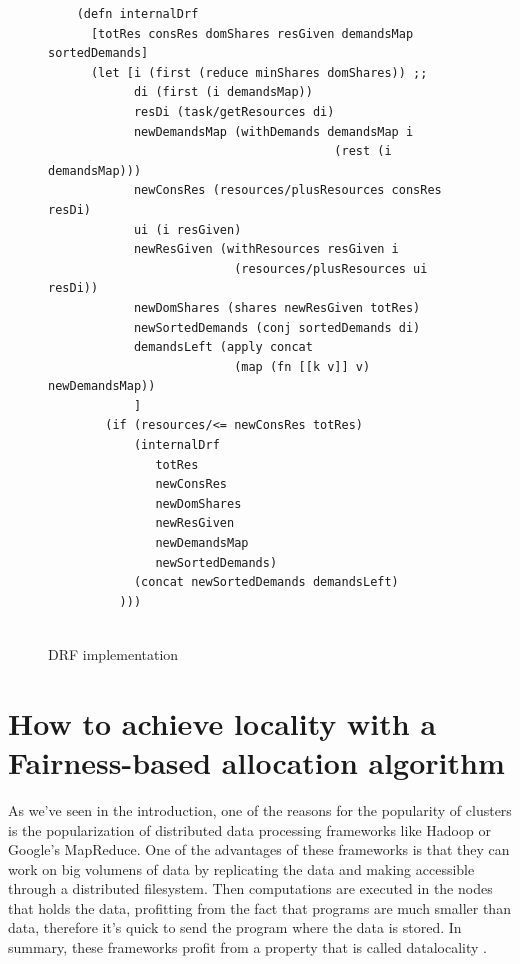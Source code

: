 \documentclass{report}                     %
\begin{document}
\begin{figure}[!ht]
\centering
\begin{verbatim}
    (defn internalDrf
      [totRes consRes domShares resGiven demandsMap sortedDemands]
      (let [i (first (reduce minShares domShares)) ;;
            di (first (i demandsMap))
            resDi (task/getResources di)
            newDemandsMap (withDemands demandsMap i
                                        (rest (i demandsMap)))
            newConsRes (resources/plusResources consRes resDi)
            ui (i resGiven)
            newResGiven (withResources resGiven i
                          (resources/plusResources ui resDi))
            newDomShares (shares newResGiven totRes)
            newSortedDemands (conj sortedDemands di)
            demandsLeft (apply concat
                          (map (fn [[k v]] v) newDemandsMap))
            ]
        (if (resources/<= newConsRes totRes)
            (internalDrf
               totRes
               newConsRes
               newDomShares
               newResGiven
               newDemandsMap
               newSortedDemands)
            (concat newSortedDemands demandsLeft)
          )))


\end{verbatim}

\caption{DRF implementation}
\label{fig:drf-implementation}
\end{figure}



\section {How to achieve locality with a Fairness-based allocation algorithm}
\label{sec:delayscheduling}

As we've seen in the introduction, one of the reasons for the
popularity of clusters is the popularization of distributed data
processing frameworks like Hadoop or Google's MapReduce. One of the
advantages of these frameworks is that they can work on big volumens
of data by replicating the data and making accessible through a
distributed filesystem. Then computations are executed in the nodes
that holds the data, profitting from the fact that programs are much
smaller than data, therefore it's quick to send the program where the
data is stored. In summary, these frameworks profit from a property
that is called datalocality \cite{chung_maximizing_2006}.
\end{document}
